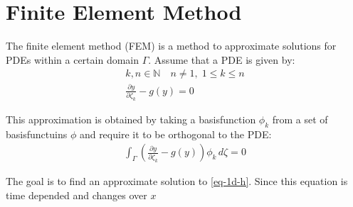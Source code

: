 \section{Finite Element Method}
The finite element method (FEM) is a method to approximate solutions for PDEs within a certain domain \(\Gamma\).
Assume that a PDE is given by:
\begin{gather}
k, n \in \mathbb{N} \quad n \neq 1, \; 1 \leq k \leq n \\
\frac{\partial y}{\partial \zeta_{k}} -  g(y) = 0 \label{eq-pde-gen} 
\end{gather}

This approximation is obtained by taking a basisfunction \(\phi_{k}\) from a set of basisfunctuins \(\phi\) and require it to be orthogonal to the PDE:
\begin{gather}
\int_{\Gamma} (\frac{\partial y}{\partial \zeta_{k}} - g(y)) \phi_{k}        \, d\zeta = 0
\end{gather}

The goal is to find an approximate solution to \ref{eq-1d-h}.
Since this equation is time depended and changes over \(x\) 
